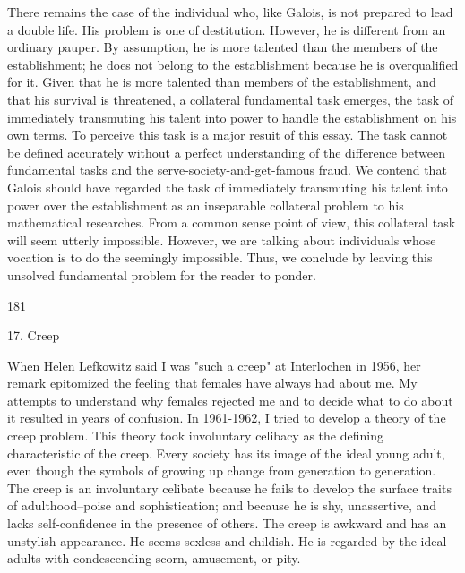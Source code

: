\documentclass[10pt,twoside]{memoir}
\begin{document}
\begin{enumerate}
{\begin{enumerate}
\begin{sysrules}
\begin{sysrules}
\begin{sysrules}
\begin{sysrules}
{\begin{enumerate}
{{{{{{{There remains the case of the individual who, like Galois, is not 
prepared to lead a double life. His problem is one of destitution. However, 
he is different from an ordinary pauper. By assumption, he is more talented 
than the members of the establishment; he does not belong to the 
establishment because he is overqualified for it. Given that he is more 
talented than members of the establishment, and that his survival is 
threatened, a collateral fundamental task emerges, the task of immediately 
transmuting his talent into power to handle the establishment on his own 
terms. To perceive this task is a major resuit of this essay. The task cannot be 
defined accurately without a perfect understanding of the difference 
between fundamental tasks and the serve-society-and-get-famous fraud. We 
contend that Galois should have regarded the task of immediately 
transmuting his talent into power over the establishment as an inseparable 
collateral problem to his mathematical researches. From a common sense 
point of view, this collateral task will seem utterly impossible. However, we 
are talking about individuals whose vocation is to do the seemingly 
impossible. Thus, we conclude by leaving this unsolved fundamental problem 
for the reader to ponder. 


181 


17. Creep 


When Helen Lefkowitz said I was "such a creep" at Interlochen in 
1956, her remark epitomized the feeling that females have always had about 
me. My attempts to understand why females rejected me and to decide what 
to do about it resulted in years of confusion. In 1961-1962, I tried to 
develop a theory of the creep problem. This theory took involuntary 
celibacy as the defining characteristic of the creep. Every society has its 
image of the ideal young adult, even though the symbols of growing up 
change from generation to generation. The creep is an involuntary celibate 
because he fails to develop the surface traits of adulthood--poise and 
sophistication; and because he is shy, unassertive, and lacks self-confidence 
in the presence of others. The creep is awkward and has an unstylish 
appearance. He seems sexless and childish. He is regarded by the ideal adults 
with condescending scorn, amusement, or pity. 

}}}}}}}
\end{enumerate}}
\end{sysrules}
\end{sysrules}
\end{sysrules}
\end{sysrules}
\end{enumerate}}
\end{enumerate}
\end{document}
